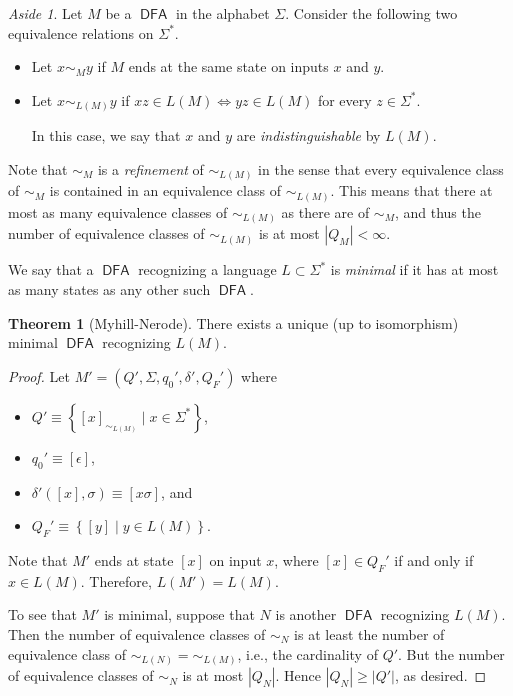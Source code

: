 \documentclass[10pt,letterpaper,cm]{nupset}
\theoremstyle{definition}
\theoremstyle{theorem}
\newtheorem{theorem}[definition]{Theorem}
\theoremstyle{remark}
\newtheorem*{aside}{Aside}
\newcommand{\1}{\mathbf{1}}
\newcommand{\0}{\vec 0}
\DeclareMathOperator{\DFA}{\mathsf{DFA}}
\begin{document}
\begin{aside}
Let $M$ be a $\DFA$ in the alphabet $\Sigma$. Consider the following two equivalence relations on $\Sigma^{\ast}$.
\begin{itemize}
\item Let $x\sim_M y$ if $M$ ends at the same state on inputs $x$ and $y$. 
\item Let $x\sim_{L(M)} y$ if $xz \in L(M) \iff yz \in L(M)$ for every $z\in \Sigma^{\ast}$.

In this case, we say that $x$ and $y$ are \textit{indistinguishable} by $L(M)$.
\end{itemize}
Note that $\sim_M$ is a \textit{refinement} of $\sim_{L(M)}$ in the sense that every equivalence class of $\sim_M$ is contained in an equivalence class of $\sim_{L(M)}$. This means that there at most as many equivalence classes of $\sim_{L(M)}$ as there are of $\sim_M$, and thus the number of equivalence classes of $\sim_{L(M)}$ is at most $\left\lvert{Q_M}\right\rvert <\infty$.

\smallskip

We say that a $\DFA$ recognizing a language $L\subset \Sigma^{\ast}$ is \textit{minimal} if it has at most as many states as any other such $\DFA$.
\begin{theorem}[Myhill-Nerode]
There exists a unique (up to isomorphism) minimal $\DFA$  recognizing $L(M)$.
\end{theorem}
\begin{proof}
Let $M' = \left(Q', \Sigma, q_0', \delta', Q_F'\right)$ where
\begin{itemize}
\item $Q' \equiv \left\{\left[x\right]_{\sim_{L(M)}} \mid x\in \Sigma^{\ast}\right\}$,
\item $q_0' \equiv \left[\epsilon\right]$,
\item $\delta'(\left[x\right], \sigma) \equiv \left[x\sigma\right]$, and 
\item $Q_F' \equiv \left\{\left[y\right] \mid y \in L(M)\right\}$.
\end{itemize}
Note that $M'$ ends at state $\left[x\right]$ on input $x$, where $\left[x\right]\in Q_F'$ if and only if $x\in L(M)$. Therefore, $L(M') = L(M)$. 

To see that $M'$ is minimal, suppose that $N$ is another $\DFA$  recognizing $L(M)$. Then the number of equivalence classes of $\sim_N$ is at least the number of equivalence class of $\sim_{L(N)} = \sim_{L(M)}$, i.e., the cardinality of $Q'$. But  the number of equivalence classes of $\sim_N$ is at most $\left\lvert{Q_N}\right\rvert$. Hence $\left\lvert{Q_N}\right\rvert \geq \left\lvert{Q'}\right\rvert$, as desired.


\end{proof}
\end{aside}
\end{document}
